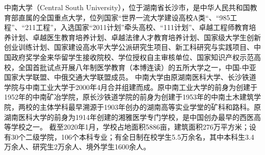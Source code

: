 
\begin{summary}
    中南大学（Central South University），位于湖南省长沙市，是中华人民共和国教育部直属的全国重点大学，位列国家“世界一流大学建设高校A类“、“985工程”、“211工程”，入选国家“2011计划”牵头高校、“111计划”、卓越工程师教育培养计划、卓越医生教育培养计划、卓越法律人才教育培养计划、国家级大学生创新创业训练计划、国家建设高水平大学公派研究生项目、新工科研究与实践项目、中国政府奖学金来华留学生接收院校、学位授权自主审核单位、国家知识产权示范高校，全国首批试点开展八年制医学教育（本博连读）的五所大学之一，中国-中亚国家大学联盟、中俄交通大学联盟成员。
    中南大学由原湖南医科大学、长沙铁道学院与中南工业大学于2000年4月合并组建而成。原中南工业大学的前身为创建于1952年的中南矿冶学院，原长沙铁道学院的前身为创建于1953年的中南土木建筑学院，两校的主体学科最早溯源于1903年创办的湖南高等实业学堂的矿科和路科。原湖南医科大学的前身为1914年创建的湘雅医学专门学校，是中国创办最早的西医高等学校之一。
    截至2020年1月，学校占地面积5886亩，建筑面积276万平方米；设有30个二级学院，106个本科专业；有全日制在校学生5.5万余名，其中本科生3.4万余人、研究生2万余人、境外学生1600余人。
\end{summary}
